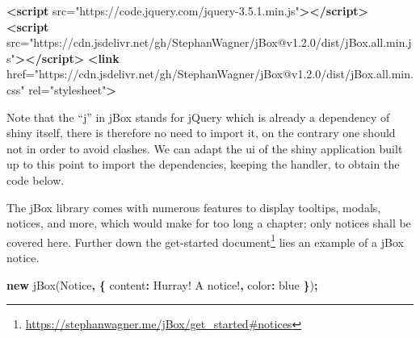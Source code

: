 \documentclass[
]{krantz}
\makeatletter
\newenvironment{Shaded}{\begin{snugshade}}{\end{snugshade}}
\newcommand{\AttributeTok}[1]{\textcolor[rgb]{0.61,0.61,0.61}{#1}}
\newcommand{\DataTypeTok}[1]{\textcolor[rgb]{0.27,0.27,0.27}{#1}}
\newcommand{\KeywordTok}[1]{\textcolor[rgb]{0.27,0.27,0.27}{\textbf{#1}}}
\newcommand{\NormalTok}[1]{#1}
\newcommand{\OperatorTok}[1]{\textcolor[rgb]{0.43,0.43,0.43}{\textbf{#1}}}
\newcommand{\OtherTok}[1]{\textcolor[rgb]{0.37,0.37,0.37}{#1}}
\newcommand{\StringTok}[1]{\textcolor[rgb]{0.5,0.5,0.5}{#1}}
\renewcommand{\href}[2]{#2\footnote{\url{#1}}}
\newenvironment{kframe}{%
\medskip{}
\setlength{\fboxsep}{.8em}
 \def\at@end@of@kframe{}%
 \ifinner\ifhmode%
  \def\at@end@of@kframe{\end{minipage}}%
  \begin{minipage}{\columnwidth}%
 \fi\fi%
 \def\FrameCommand##1{\hskip\@totalleftmargin \hskip-\fboxsep
 \colorbox{shadecolor}{##1}\hskip-\fboxsep
     \hskip-\linewidth \hskip-\@totalleftmargin \hskip\columnwidth}%
 \MakeFramed {\advance\hsize-\width
   \@totalleftmargin\z@ \linewidth\hsize
   \@setminipage}}%
 {\par\unskip\endMakeFramed%
 \at@end@of@kframe}
\renewenvironment{Shaded}{\begin{kframe}}{\end{kframe}}
\makeatother
\begin{document}
\begin{Shaded}
\begin{Highlighting}[]
\KeywordTok{<script}\OtherTok{ src=}\StringTok{"https://code.jquery.com/jquery{-}3.5.1.min.js"}\KeywordTok{></script>}
\KeywordTok{<script}\OtherTok{ src=}\StringTok{"https://cdn.jsdelivr.net/gh/StephanWagner/jBox@v1.2.0/dist/jBox.all.min.js"}\KeywordTok{></script>}
\KeywordTok{<link}\OtherTok{ href=}\StringTok{"https://cdn.jsdelivr.net/gh/StephanWagner/jBox@v1.2.0/dist/jBox.all.min.css"}\OtherTok{ rel=}\StringTok{"stylesheet"}\KeywordTok{>}
\end{Highlighting}
\end{Shaded}

Note that the ``j'' in jBox stands for jQuery which is already a dependency of shiny itself, there is therefore no need to import it, on the contrary one should not in order to avoid clashes. We can adapt the ui of the shiny application built up to this point to import the dependencies, keeping the handler, to obtain the code below.

\begin{Shaded}
\end{Shaded}

The jBox library comes with numerous features to display tooltips, modals, notices, and more, which would make for too long a chapter; only notices shall be covered here. Further down the \href{https://stephanwagner.me/jBox/get_started\#notices}{get-started document} lies an example of a jBox notice.

\begin{Shaded}
\begin{Highlighting}[]
\KeywordTok{new} \AttributeTok{jBox}\NormalTok{(}\StringTok{\textquotesingle{}Notice\textquotesingle{}}\OperatorTok{,} \OperatorTok{\{}
  \DataTypeTok{content}\OperatorTok{:} \StringTok{\textquotesingle{}Hurray! A notice!\textquotesingle{}}\OperatorTok{,}
  \DataTypeTok{color}\OperatorTok{:} \StringTok{\textquotesingle{}blue\textquotesingle{}}
\OperatorTok{\}}\NormalTok{)}\OperatorTok{;}
\end{Highlighting}
\end{Shaded}
\end{document}
